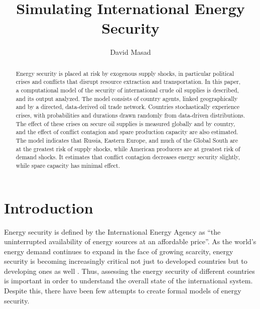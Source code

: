 \documentclass{llncs}
\begin{document}
\title{Simulating International Energy Security}
	\author{David Masad}
	\date{}
	\maketitle


\begin{abstract}
Energy security is placed at risk by exogenous supply shocks, in particular political crises and conflicts that disrupt resource extraction and transportation. In this paper, a computational model of the security of international crude oil supplies is described, and its output analyzed. The model consists of country agents, linked geographically and by a directed, data-derived oil trade network. Countries stochastically experience crises, with probabilities and durations drawn randomly from data-driven distributions. The effect of these crises on secure oil supplies is measured globally and by country, and the effect of conflict contagion and spare production capacity are also estimated. The model indicates that Russia, Eastern Europe, and much of the Global South are at the greatest risk of supply shocks, while American producers are at greatest risk of demand shocks. It estimates that conflict contagion decreases energy security slightly, while spare capacity has minimal effect. 
\end{abstract}

\section{Introduction}

Energy security is defined by the International Energy Agency as ``the uninterrupted availability of energy sources at an affordable price''\cite{iea_2013}. As the world's energy demand continues to expand in the face of growing scarcity, energy security is becoming increasingly critical not just to developed countries but to developing ones as well \cite{yergin_2006}. Thus, assessing the energy security of different countries is important in order to understand the overall state of the international system. Despite this, there have been few attempts to create formal models of energy security. 
\end{document}
